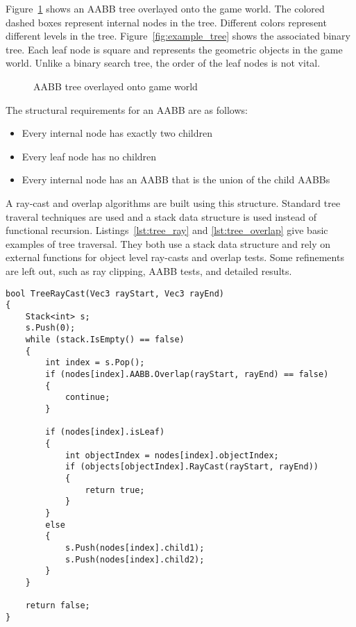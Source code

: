 \documentclass{article}
\begin{document}
Figure~\ref{fig:overlay} shows an AABB tree overlayed onto the game world. The colored dashed boxes represent internal nodes in the tree. Different colors represent different levels in the tree. Figure~\ref{fig:example_tree} shows the associated binary tree. Each leaf node is square and represents the geometric objects in the game world. Unlike a binary search tree, the order of the leaf nodes is not vital.
\begin{figure}
	\begin{center}
		
	\end{center}
	\caption{AABB tree overlayed onto game world}
	\label{fig:overlay}
\end{figure}



The structural requirements for an AABB are as follows:
\begin{itemize}
	\item Every internal node has exactly two children
	\item Every leaf node has no children
	\item Every internal node has an AABB that is the union of the child AABBs
\end{itemize}

A ray-cast and overlap algorithms are built using this structure. Standard tree traveral techniques are used and a stack data structure is used instead of functional recursion. Listings~\ref{lst:tree_ray} and \ref{lst:tree_overlap} give basic examples of tree traversal. They both use a stack data structure and rely on external functions for object level ray-casts and overlap tests. Some refinements are left out, such as ray clipping, AABB tests, and detailed results.

\begin{lstlisting}[caption={Tree ray-cast}, label={lst:tree_ray}, float]
bool TreeRayCast(Vec3 rayStart, Vec3 rayEnd)
{
	Stack<int> s;
	s.Push(0);
	while (stack.IsEmpty() == false)
	{
		int index = s.Pop();
		if (nodes[index].AABB.Overlap(rayStart, rayEnd) == false)
		{
			continue;
		}

		if (nodes[index].isLeaf)
		{
			int objectIndex = nodes[index].objectIndex;
			if (objects[objectIndex].RayCast(rayStart, rayEnd))
			{
				return true;
			}
		}
		else
		{
			s.Push(nodes[index].child1);
			s.Push(nodes[index].child2);
		}
	}

	return false;
}
\end{lstlisting}
\end{document}
